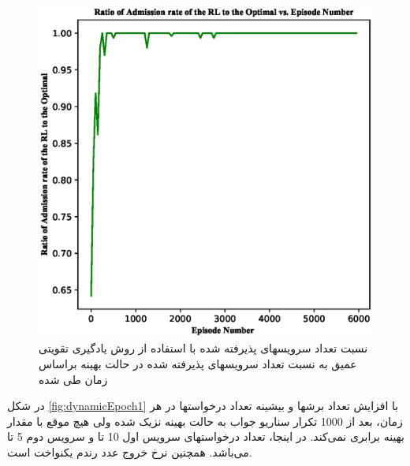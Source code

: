 \begin{figure}%
	\centering
	\includegraphics[scale = 0.6]{./fig/dynamicEpoch_0} %
	\caption{  نسبت تعداد سرویسهای پذیرفته شده با استفاده از روش یادگیری تقویتی عمیق به نسبت تعداد سرویسهای پذیرفته شده در حالت بهینه براساس زمان طی شده}
	\label{fig:dynamicEpoch}
\end{figure}
در شکل \ref{fig:dynamicEpoch1}
با افزایش تعداد برشها و بیشینه تعداد درخواستها در هر زمان، بعد از 1000 تکرار سناریو جواب به حالت بهینه نزیک شده ولی هیچ موقع با مقدار بهینه برابری نمی‌کند. در اینجا، تعداد درخواستهای سرویس اول 10 تا و سرویس دوم 5 تا می‌باشد. همچنین نرخ خروج عدد رندم یکنواخت است. 
